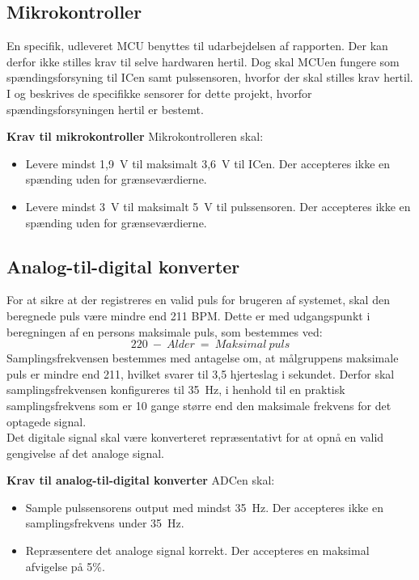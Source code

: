 \subsection{Mikrokontroller} \label{krav_mikro_spaending}
En specifik, udleveret MCU benyttes til udarbejdelsen af rapporten. Der kan derfor ikke stilles krav til selve hardwaren hertil. Dog skal MCUen fungere som spændingsforsyning til ICen samt pulssensoren, hvorfor der skal stilles krav hertil. I  og  beskrives de specifikke sensorer for dette projekt, hvorfor spændingsforsyningen hertil er bestemt.

\textbf{Krav til mikrokontroller} \newline 
Mikrokontrolleren skal:
\begin{itemize}
	\item Levere mindst 1,9~V til maksimalt 3,6~V til ICen. Der accepteres ikke en spænding uden for grænseværdierne.
	\item Levere mindst 3~V til maksimalt 5~V til pulssensoren. Der accepteres ikke en spænding uden for grænseværdierne.
\end{itemize}

\subsection{Analog-til-digital konverter} \label{krav_adc}
For at sikre at der registreres en valid puls for brugeren af systemet, skal den beregnede puls være mindre end 211 BPM. Dette er med udgangspunkt i beregningen af en persons maksimale puls, som bestemmes ved: \citep{CooperBlair2005} 
\begin{equation}
220~-~Alder~=~Maksimal~puls
\end{equation}
Samplingsfrekvensen bestemmes med antagelse om, at målgruppens maksimale puls er mindre end 211, hvilket svarer til 3,5 hjerteslag i sekundet. Derfor skal samplingsfrekvensen konfigureres til 35~Hz, i henhold til en praktisk samplingsfrekvens som er 10 gange større end den maksimale frekvens for det optagede signal. \citep{Webster2011}\\
Det digitale signal skal være konverteret repræsentativt for at opnå en valid gengivelse af det analoge signal.

\textbf{Krav til analog-til-digital konverter} \newline
ADCen skal:
\begin{itemize}
	\item Sample pulssensorens output med mindst 35~Hz. Der accepteres ikke en samplingsfrekvens under 35~Hz. 
	\item Repræsentere det analoge signal korrekt. Der accepteres en maksimal afvigelse på 5\%. 
\end{itemize}

